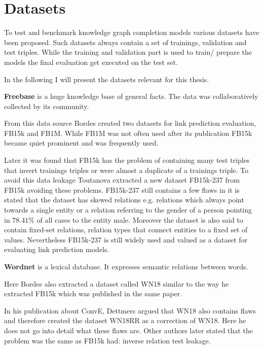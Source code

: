 \section{Datasets}
\label{cha:datasets}
To test and benchmark knowledge graph completion models various datasets have been proposed. Such datasets always contain a set of trainings, validation and test triples. While the training and validation part is used to train/ prepare the models the final evaluation get executed on the test set. 

In the following I will present the datasets relevant for this thesis. \hfill \break

\textbf{Freebase} is a huge knowledge base of general facts. The data was collaboratively collected by its community.

From this data source Bordes \cite{bordes_translating_2013} created two datasets for link prediction evaluation, FB15k and FB1M. While FB1M was not often used after its publication FB15k became quiet prominent and was frequently used.  

Later it was found that FB15k has the problem of containing many test triples that invert trainings triples or were almost a duplicate of a trainings triple. To avoid this data leakage Toutanova \cite{toutanova_observed_2015} extracted a new dataset FB15k-237 from FB15k avoiding these problems. FB15k-237 still contains a few flaws in \cite{safavi_codex_2020} it is stated that the dataset has skewed relations e.g. relations which always point towards a single entity or a relation referring to the gender of a person pointing in $78.41\%$ of all cases to the entity male. Moreover the dataset is also said to contain fixed-set relations, relation types that connect entities to a fixed set of values. Nevertheless FB15k-237 is still widely used and valued as a dataset for evaluating link prediction models. \hfill \break

\textbf{Wordnet} is a lexical database. It expresses semantic relations between words. 

Here Bordes \cite{bordes_translating_2013} also extracted a dataset called WN18 similar to the way he extracted FB15k which was published in the same paper. 

In his publication about ConvE, Dettmers \cite{dettmers_convolutional_2018} argued that WN18 also contains flaws and therefore created the dataset WN18RR as a correction of WN18. Here he does not go into detail what these flaws are. Other authors later stated that the problem was the same as FB15k had: inverse relation test leakage. \cite{shang_end--end_2018} \hfill \break

